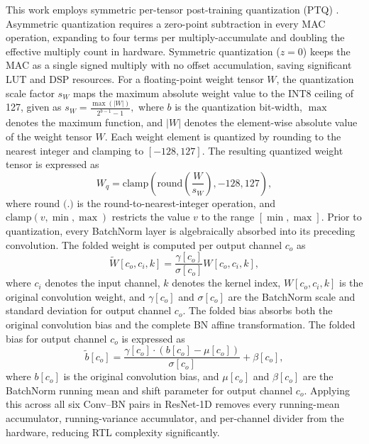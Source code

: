 \documentclass[conference]{IEEEtran}
\begin{document}
This work employs symmetric per-tensor post-training quantization (PTQ) \cite{b18}. Asymmetric quantization requires a zero-point subtraction in every MAC operation, expanding to four terms per multiply-accumulate and doubling the effective multiply count in hardware. Symmetric quantization ($z = 0$) keeps the MAC as a single signed multiply with no offset accumulation, saving significant LUT and DSP resources. For a floating-point weight tensor $W$, the quantization scale factor $s_W$ maps the maximum absolute weight value to the INT8 ceiling of 127, given as $s_W = \frac{\max(|W|)}{2^{b-1} - 1},$
where $b$ is the quantization bit-width, $\max$ denotes the maximum function, and $|W|$ denotes the element-wise absolute value of the weight tensor $W$. Each weight element is quantized by rounding to the nearest integer and clamping to $[-128, 127]$. The resulting quantized weight tensor is expressed as
\begin{equation}
W_q = \text{clamp}\left(\text{round}\left(\frac{W}{s_W}\right), -128, 127\right),
\label{eq:quant}
\end{equation}
where $\text{round (.)}$ is the round-to-nearest-integer operation, and $\text{clamp}(v, \min, \max)$ restricts the value $v$ to the range $[\min, \max]$.
Prior to quantization, every BatchNorm layer is algebraically absorbed into its preceding convolution. The folded weight is computed per output channel $c_o$ as
\begin{equation}
\tilde{W}[c_o, c_i, k] = \frac{\gamma[c_o]}{\sigma[c_o]} W[c_o, c_i, k],
\label{eq:bnfold_w}
\end{equation}
where $c_i$ denotes the input channel,  $k$ denotes the kernel index, $W[c_o, c_i, k]$ is the original convolution weight, and $\gamma[c_o]$ and $\sigma[c_o]$ are the BatchNorm scale and standard deviation for output channel $c_o$. The folded bias absorbs both the original convolution bias and the complete BN affine transformation. The folded bias for output channel $c_o$ is expressed as
\begin{equation}
\tilde{b}[c_o] = \frac{\gamma[c_o] \cdot (b[c_o] - \mu[c_o])}{\sigma[c_o]} + \beta[c_o],
\label{eq:bnfold_b}
\end{equation}
where $b[c_o]$ is the original convolution bias, and $\mu[c_o]$ and $\beta[c_o]$ are the BatchNorm running mean and shift parameter for output channel $c_o$. Applying this across all six Conv--BN pairs in ResNet-1D removes every running-mean accumulator, running-variance accumulator, and per-channel divider from the hardware, reducing RTL complexity significantly.
\end{document}
